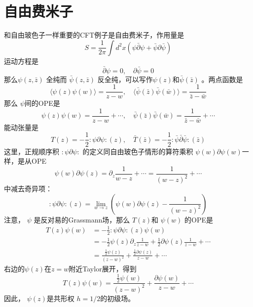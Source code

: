 \section{自由费米子}
和自由玻色子一样重要的CFT例子是自由费米子，作用量是
\begin{equation}
	S=\frac{1}{2 \pi} \int d^{2} x(\psi \bar{\partial} \psi+\bar{\psi} \partial \bar{\psi})
\end{equation}
运动方程是
\begin{equation}
	\bar{\partial} \psi=0, \quad \partial \bar{\psi}=0
\end{equation}
那么$ \psi(z,\bar{z})$ 全纯而 $\bar{\psi}(z,\bar{z})$ 反全纯，可以写作$ \psi(z) $和$ \bar{\psi}(\bar{z})$ 。两点函数是
\begin{equation}
	\langle\psi(z) \psi(w)\rangle=\frac{1}{z-w}, \quad\langle\bar{\psi}(\bar{z}) \bar{\psi}(\bar{w})\rangle=\frac{1}{\bar{z}-\bar{w}}
\end{equation}
那么 $\psi $间的OPE是
\begin{equation}
	\psi(z) \psi(w)=\frac{1}{z-w}+\cdots, \quad \bar{\psi}(\bar{z}) \bar{\psi}(\bar{w})=\frac{1}{\bar{z}-\bar{w}}+\cdots
\end{equation}
能动张量是
\begin{equation}
	T(z)=-\frac{1}{2}: \psi \partial \psi:(z), \quad \bar{T}(\bar{z})=-\frac{1}{2}: \bar{\psi} \bar{\partial} \bar{\psi}:(\bar{z})
\end{equation}
这里，正规顺序积 $: \psi \partial \psi:$ 的定义同自由玻色子情形的算符乘积 $\psi(w)\partial \psi(w) $一样，是从OPE
$$
\psi(w) \partial \psi(z)=\partial_{z} \frac{1}{w-z}+\cdots=\frac{1}{(w-z)^{2}}+\cdots
$$
中减去奇异项：
\begin{equation}
		: \psi \partial \psi:(z)=\lim _{w \rightarrow z}\left(\psi(w) \partial \psi(z)-\frac{1}{(w-z)^{2}}\right)
\end{equation}
注意， $\psi$ 是反对易的Grassmann场，那么 $T(z) $和 $\psi(w)$ 的OPE是
\begin{equation}
	\begin{aligned} T(z) \psi(w) &=-\frac{1}{2}: \psi \partial \psi:(z) \psi(w) \\ &=-\frac{1}{2} \psi(z) \partial_{z} \frac{1}{z-w}+\frac{1}{2} \partial \psi(z) \frac{1}{z-w}+\cdots \\ &=\frac{\frac{1}{2} \psi(z)}{(z-w)^{2}}+\frac{\frac{1}{2} \partial \psi(z)}{z-w}+\cdots \end{aligned}
\end{equation}
右边的$\psi(z) $在$ z=w $附近Taylor展开，得到
\begin{equation}
	T(z) \psi(w)=\frac{\frac{1}{2} \psi(w)}{(z-w)^{2}}+\frac{\partial \psi(w)}{z-w}+\cdots
\end{equation}
因此， $\psi(z) $是共形权 $h=1/2 $的初级场。

